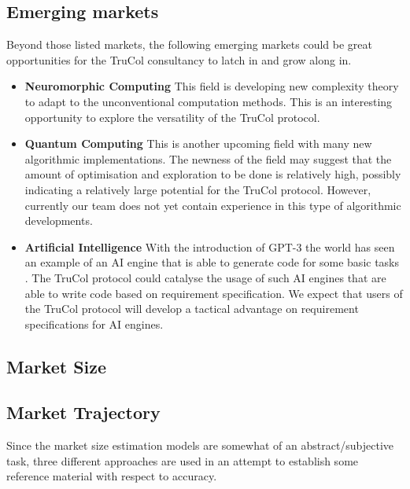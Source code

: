 \subsection{Emerging markets}
Beyond those listed markets, the following emerging markets could be great opportunities for the TruCol consultancy to latch in and grow along in.
\begin{itemize}
	\item \textbf{Neuromorphic Computing} This field is developing new complexity theory to adapt to the unconventional computation methods. This is an interesting opportunity to explore the versatility of the TruCol protocol.
	\item \textbf{Quantum Computing} This is another upcoming field with many new algorithmic implementations. The newness of the field may suggest that the amount of optimisation and exploration to be done is relatively high, possibly indicating a relatively large potential for the TruCol protocol. However, currently our team does not yet contain experience in this type of algorithmic developments.
	\item \textbf{Artificial Intelligence} With the introduction of GPT-3 the world has seen an example of an AI engine that is able to generate code for some basic tasks \cite{todo}. The TruCol protocol could catalyse the usage of such AI engines that are able to write code based on requirement specification. We expect that users of the TruCol protocol will develop a tactical advantage on requirement specifications for AI engines.
\end{itemize}

\subsection{Market Size}\label{subsec:model_description_market_size}
\subsection{Market Trajectory}\label{subsec:model_description_market_trajectory}

Since the market size estimation models are somewhat of an abstract/subjective task, three different approaches are used in an attempt to establish some reference material with respect to accuracy.




